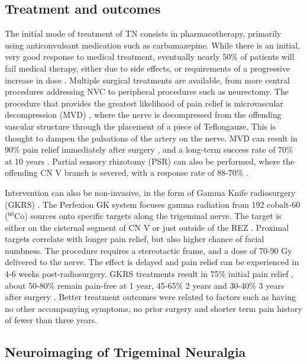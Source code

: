 \subsection{Treatment and outcomes}

The initial mode of treatment of TN consists in pharmacotherapy, primarily using anticonvulsant medication such as carbamazepine. While there is an initial, very good response to medical treatment, eventually nearly 50\% of patients will fail medical therapy, either due to side effects, or requirements of a progressive increase in dose \cite{Rappaport1994}. Multiple surgical treatments are available, from more central procedures addressing NVC to peripheral procedures such as neurectomy. The procedure that provides the greatest likelihood of pain relief is microvascular decompression (MVD) \cite{Lovely1997,Hodaie2013}, where the nerve is decompressed from the offending vascular structure through the placement of a piece of Teflon\textcopyright gauze. This is thought to dampen the pulsations of the artery on the nerve. MVD can result in 90\% pain relief immediately after surgery \cite{Zakrzewska2005}, and a long-term success rate of 70\% at 10 years \cite{Barker1996}.
Partial sensory rhizotomy (PSR) can also be performed, where the offending CN V branch is severed, with a response rate of 88-70\% \cite{Young1993,Zakrzewska2005}. 

Intervention can also be non-invasive, in the form of Gamma Knife radiosurgery (GKRS) \cite{Hodaie2012g}. The Perfexion GK system focuses gamma radiation from 192 cobalt-60 ($^{60}$Co) sources onto specific targets along the trigeminal nerve. The target is either on the cisternal segment of CN V or just outside of the REZ \cite{Daugherty2015}. Proximal targets correlate with longer pain relief, but also higher chance of facial numbness\cite{Xu2014}. The procedure requires a stereotactic frame, and a dose of 70-90 Gy delivered to the nerve. The effect is delayed and pain relief can be experienced in 4-6 weeks post-radiosurgery. GKRS treatments result in 75\% initial pain relief \cite{Tuleasca2015,Kondziolka2010}, about 50-80\% remain pain-free at 1 year, 45-65\% 2 years and 30-40\% 3 years after surgery \cite{Kondziolka2010,Sheehan2005}. Better treatment outcomes were related to factors such as having no other accompanying symptoms, no prior surgery and shorter term pain history of fewer than three years.

\subsection{Neuroimaging of Trigeminal Neuralgia}

